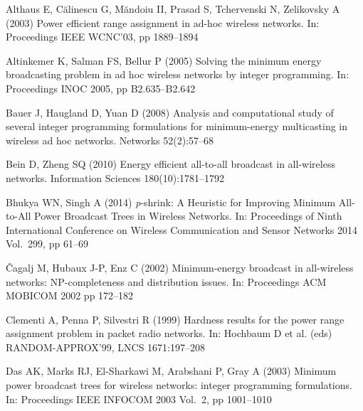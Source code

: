\documentclass[natbib,smallextended]{svjour3}       %
\begin{document}
\begin{thebibliography}{}

%
%

Althaus E, C\u{a}linescu G, M\u{a}ndoiu II, Prasad S, Tchervenski N, Zelikovsky A (2003)
Power efficient range assignment in ad-hoc wireless networks.
In: Proceedings IEEE WCNC’03, pp 1889--1894

Altinkemer K, Salman FS, Bellur P (2005)
Solving the minimum energy broadcasting problem in ad hoc wireless networks by integer programming.
In: Proceedings INOC 2005, pp B2.635--B2.642

Bauer J, Haugland D, Yuan D (2008)
Analysis and computational study of several integer programming formulations for minimum-energy multicasting in wireless ad hoc networks.
Networks 52(2):57--68

Bein D, Zheng SQ (2010)
Energy efficient all-to-all broadcast in all-wireless networks.
Information Sciences 180(10):1781--1792

Bhukya WN, Singh A (2014)
\emph{p}-shrink: A Heuristic for Improving Minimum All-to-All Power Broadcast Trees in Wireless Networks.
In: Proceedings of Ninth International Conference on Wireless Communication and Sensor Networks 2014 
Vol.\ 299, pp 61--69

\v{C}agalj M, Hubaux J-P, Enz C (2002)
Minimum-energy broadcast in all-wireless networks: NP-completeness and distribution issues.
In: Proceedings ACM MOBICOM 2002 pp 172--182

Clementi A, Penna P, Silvestri R (1999)
Hardness results for the power range assignment problem in packet radio networks.
In: Hochbaum D et al. (eds) RANDOM-APPROX’99,
LNCS 1671:197--208

Das AK, Marks RJ, El-Sharkawi M, Arabshani P, Gray A (2003)
Minimum power broadcast trees for wireless networks: integer programming formulations.
In: Proceedings IEEE INFOCOM 2003 Vol.\ 2, pp 1001--1010


\end{thebibliography}
\end{document}
